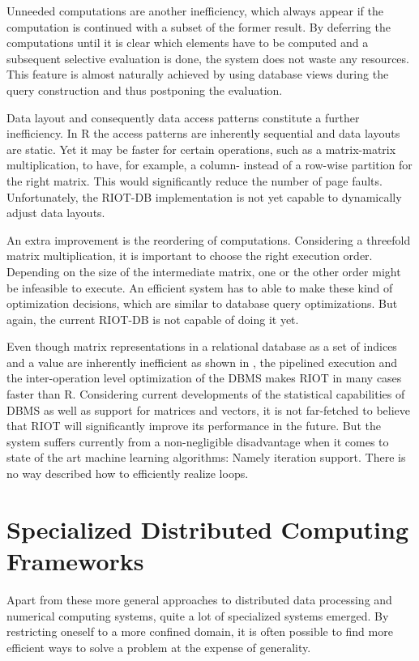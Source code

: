 Unneeded computations are another inefficiency, which always appear if the computation is continued with a subset of the former result.
By deferring the computations until it is clear which elements have to be computed and a subsequent selective evaluation is done, the system does not waste any resources.
This feature is almost naturally achieved by using database views during the query construction and thus postponing the evaluation.

Data layout and consequently data access patterns constitute a further inefficiency.
In R the access patterns are inherently sequential and data layouts are static.
Yet it may be faster for certain operations, such as a matrix-matrix multiplication, to have, for example, a column- instead of a row-wise partition for the right matrix.
This would significantly reduce the number of page faults.
Unfortunately, the RIOT-DB implementation is not yet capable to dynamically adjust data layouts.

An extra improvement is the reordering of computations.
Considering a threefold matrix multiplication, it is important to choose the right execution order.
Depending on the size of the intermediate matrix, one or the other order might be infeasible to execute.
An efficient system has to able to make these kind of optimization decisions, which are similar to database query optimizations.
But again, the current RIOT-DB is not capable of doing it yet.

Even though matrix representations in a relational database as a set of indices and a value are inherently inefficient as shown in \cite{stonebraker:2007a}, the pipelined execution and the inter-operation level optimization of the DBMS makes RIOT in many cases faster than R.
Considering current developments of the statistical capabilities of DBMS as well as support for matrices and vectors, it is not far-fetched to believe that RIOT will significantly improve its performance in the future.
But the system suffers currently from a non-negligible disadvantage when it comes to state of the art machine learning algorithms: Namely iteration support.
There is no way described how to efficiently realize loops.

\section{Specialized Distributed Computing Frameworks}

Apart from these more general approaches to distributed data processing and numerical computing systems, quite a lot of specialized systems emerged.
By restricting oneself to a more confined domain, it is often possible to find more efficient ways to solve a problem at the expense of generality.

